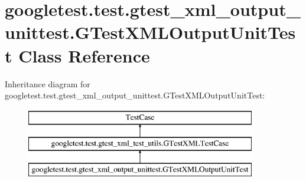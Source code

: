 \hypertarget{classgoogletest_1_1test_1_1gtest__xml__output__unittest_1_1_g_test_x_m_l_output_unit_test}{}\section{googletest.\+test.\+gtest\+\_\+xml\+\_\+output\+\_\+unittest.\+G\+Test\+X\+M\+L\+Output\+Unit\+Test Class Reference}
\label{classgoogletest_1_1test_1_1gtest__xml__output__unittest_1_1_g_test_x_m_l_output_unit_test}
Inheritance diagram for googletest.\+test.\+gtest\+\_\+xml\+\_\+output\+\_\+unittest.\+G\+Test\+X\+M\+L\+Output\+Unit\+Test\+:\begin{figure}[H]
\begin{center}
\leavevmode
\includegraphics[height=3.000000cm]{d7/dd3/classgoogletest_1_1test_1_1gtest__xml__output__unittest_1_1_g_test_x_m_l_output_unit_test}
\end{center}
\end{figure}
